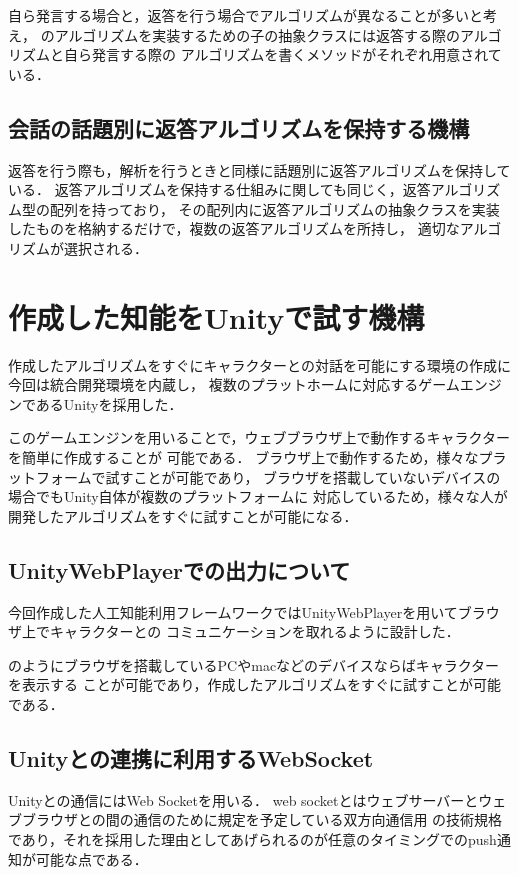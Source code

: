 自ら発言する場合と，返答を行う場合でアルゴリズムが異なることが多いと考え，
のアルゴリズムを実装するための子の抽象クラスには返答する際のアルゴリズムと自ら発言する際の
アルゴリズムを書くメソッドがそれぞれ用意されている．

\subsection{会話の話題別に返答アルゴリズムを保持する機構}
返答を行う際も，解析を行うときと同様に話題別に返答アルゴリズムを保持している．
返答アルゴリズムを保持する仕組みに関しても同じく，返答アルゴリズム型の配列を持っており，
その配列内に返答アルゴリズムの抽象クラスを実装したものを格納するだけで，複数の返答アルゴリズムを所持し，
適切なアルゴリズムが選択される．


\section{作成した知能をUnityで試す機構}
作成したアルゴリズムをすぐにキャラクターとの対話を可能にする環境の作成に今回は統合開発環境を内蔵し，
複数のプラットホームに対応するゲームエンジンであるUnityを採用した．

このゲームエンジンを用いることで，ウェブブラウザ上で動作するキャラクターを簡単に作成することが
可能である．
ブラウザ上で動作するため，様々なプラットフォームで試すことが可能であり，
ブラウザを搭載していないデバイスの場合でもUnity自体が複数のプラットフォームに
対応しているため，様々な人が開発したアルゴリズムをすぐに試すことが可能になる．

\subsection{UnityWebPlayerでの出力について}
今回作成した人工知能利用フレームワークではUnityWebPlayerを用いてブラウザ上でキャラクターとの
コミュニケーションを取れるように設計した．


のようにブラウザを搭載しているPCやmacなどのデバイスならばキャラクターを表示する
ことが可能であり，作成したアルゴリズムをすぐに試すことが可能である．

\subsection{Unityとの連携に利用するWebSocket}
Unityとの通信にはWeb Socketを用いる．
web socketとはウェブサーバーとウェブブラウザとの間の通信のために規定を予定している双方向通信用
の技術規格であり，それを採用した理由としてあげられるのが任意のタイミングでのpush通知が可能な点である．

